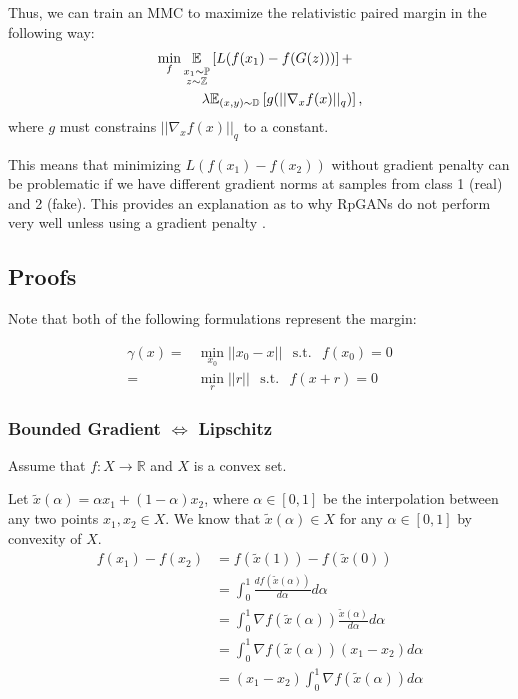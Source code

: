 \documentclass{article}
\begin{document}
Thus, we can train an MMC to maximize the relativistic paired margin in the following way:
\begin{align*}
\min_f \underset{ \substack{x_1 \sim \mathbb{P}  \\ z \sim \mathbb{Z}}}{\mathbb{E}\vphantom{p}}&\left[L(f(x_1)-f(G(z)))\right] + \\ \lambda& \mathbb{E}_{(x,y)\sim \mathbb{D}}\left[g(||\nabla_x f(x)||_q)\right],
\end{align*}
where $g$ must constrains $||\nabla_x f(x)||_q$ to a constant.

This means that minimizing $L(f(x_1)-f(x_2))$ without gradient penalty can be problematic if we have different gradient norms at samples from class 1 (real) and 2 (fake). This provides an explanation as to why RpGANs do not perform very well unless using a gradient penalty \citep{jolicoeur2018relativistic}.

\subsection{Proofs}

Note that both of the following formulations represent the margin:

\begin{align*}
\gamma(x) = &\min_{x_0} || x_0 - x || \hspace{5pt} \text{ s.t. } \hspace{5pt} f(x_0)=0 \\
= &\min_{r} || r || \hspace{5pt} \text{ s.t. } \hspace{5pt} f(x+r)=0
\end{align*}

\subsubsection{Bounded Gradient $\iff$ Lipschitz }

Assume that $f:X \to \mathbb{R}$ and $X$ is a convex set.

Let $\tilde{x}(\alpha) = \alpha x_1 + (1-\alpha) x_2$, where $\alpha \in [0,1]$ be the interpolation between any two points $x_1,x_2 \in X$. We know that $\tilde{x}(\alpha) \in X$ for any $\alpha \in [0,1]$ by convexity of $X$.
\begin{align*}
f(x_1)-f(x_2) &= f(\tilde{x}(1))-f(\tilde{x}(0)) \\
&= \int_{0}^{1} \frac{df(\tilde{x}(\alpha))}{d\alpha} d\alpha \\
&= \int_{0}^{1} \nabla f(\tilde{x}(\alpha)) \frac{\tilde{x}(\alpha)}{d\alpha} d\alpha \\
&= \int_{0}^{1} \nabla f(\tilde{x}(\alpha)) (x_1-x_2) d\alpha \\
&= (x_1-x_2) \int_{0}^{1} \nabla f(\tilde{x}(\alpha)) d\alpha
\end{align*}
\end{document}
